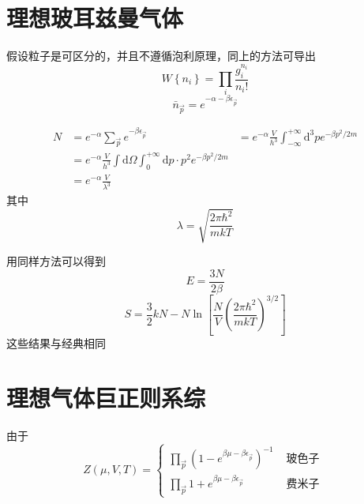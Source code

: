 \documentclass[12pt, a4paper, oneside]{ctexbook}
\newcounter{#2}
\newcounter{#2}[#1]
\numberwithin{#2}{#1}
\newcommand{\xkuo}[1]{\left(#1\right)}
\newcommand{\akuo}[1]{\left[#1\right]}
\begin{document}
          \section{理想玻耳兹曼气体}
          \begin{deduce}
            假设粒子是可区分的，并且不遵循泡利原理，同上的方法可导出
            \begin{equation}
              W\left\{n_i\right\}=\prod_i \frac{g_i^{n_i}}{n_{i} !}
            \end{equation}
            \begin{equation}
              \bar{n}_{\vec{p}}=e^{-\alpha-\beta \epsilon_{\vec{p}}}
            \end{equation}
          \end{deduce}
          \begin{deduce}
            \begin{equation}
              \begin{aligned}
                N&=e^{-\alpha} \sum_{\vec{p}} e^{-\beta \epsilon_{\vec{p}}}
                & =e^{-\alpha} \frac{V}{h^3} \int_{-\infty}^{+\infty} \mathrm{d}^3 p e^{-\beta p^2 / 2 m} \\
                & =e^{-\alpha} \frac{V}{h^3} \int \mathrm{d} \Omega \int_0^{+\infty} \mathrm{d} p \cdot p^2 e^{-\beta p^2 / 2 m}\\
                &=e^{-\alpha}\frac{V}{\lambda^3}
              \end{aligned}
            \end{equation}
            其中
            \begin{equation*}
              \lambda=\sqrt{\frac{2 \pi \hbar^2}{m k T}}
            \end{equation*}
          \end{deduce}
          \begin{deduce}
            用同样方法可以得到
            \begin{equation}
              E=\frac{3N}{2\beta}
            \end{equation}
            \begin{equation}
              S=\frac{3}{2}kN-N\ln\akuo{\frac NV\xkuo{\frac{2\pi\hbar^2}{mkT}}^{3/2}}
            \end{equation}
            这些结果与经典相同
          \end{deduce}

          \section{理想气体巨正则系综}
          \begin{deduce}
            由于
            \begin{equation}
              Z(\mu, V, T)= \begin{cases}\prod_{\vec{p}}\left(1-e^{\beta \mu-\beta \epsilon_{\vec{p}}}\right)^{-1} & \text { 玻色子 } \\ \prod_{\vec{p}} 1+e^{\beta \mu-\beta \epsilon_{\vec{p}}} & \text { 费米子 }\end{cases}
            \end{equation}
          \end{deduce}
          
\end{document}
